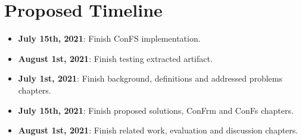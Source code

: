 \section{Proposed Timeline}
\begin{itemize}
	\item \textbf{July 15th, 2021}: Finish ConFS implementation.
	\item \textbf{August 1st, 2021}: Finish testing extracted artifact.
	\item \textbf{July 1st, 2021}: Finish background, definitions and addressed problems chapters.
	\item \textbf{July 15th, 2021}: Finish proposed solutions, ConFrm and ConFs chapters.
	\item \textbf{August 1st, 2021}: Finish related work, evaluation and discussion chapters.
\end{itemize}